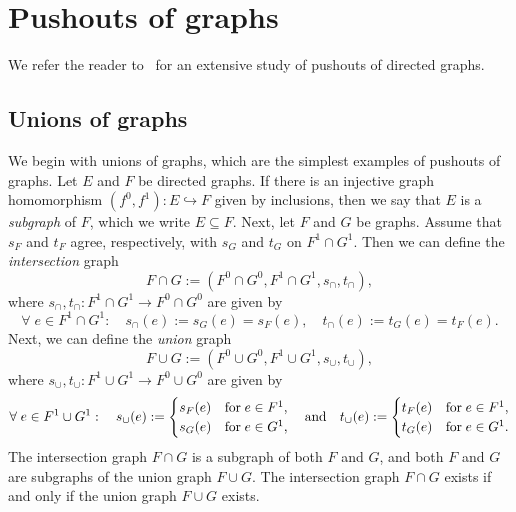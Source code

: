 \documentclass[12pt,times,a4paper]{amsart}
\numberwithin{equation}{section}
\def\text{\hbox}
\numberwithin{equation}{section}
\begin{document}

\section{Pushouts of graphs}
\noindent
We refer the reader to~\cite{ek79} for an extensive study of pushouts of directed graphs.
\subsection{Unions of graphs}
We begin with unions of graphs, which are the simplest examples of pushouts of graphs.
Let $E$ and $F$ be directed graphs. If there is an injective graph homomorphism $(f^0,f^1):E\hookrightarrow F$ given by inclusions,
 then we say that 
$E$ is a {\em subgraph} of $F$, which we write $E\subseteq F$. 
Next, let $F$ and $G$ be graphs.
 Assume that $s_F$ and $t_F$ agree, respectively, with $s_G$ and $t_G$ on $F^1\cap G^1$.
Then we can define the {\em intersection} graph 
\begin{equation}
F\cap G:=(F^0\cap G^0,F^1\cap G^1,s_\cap,t_\cap),
\end{equation}
where $s_\cap,t_\cap:F^1\cap G^1\to F^0\cap G^0$ are given by
\begin{equation}
\forall\; e\in F^1\cap G^1:\quad s_\cap(e):=s_G(e)=s_F(e),\quad t_\cap(e):=t_G(e)=t_F(e).
\end{equation}
Next, we can define the {\em union} graph 
\begin{equation}
F\cup G:=(F^0\cup G^0,F^1\cup G^1,s_\cup,t_\cup),
\end{equation}
where $s_\cup,t_\cup:F^1\cup G^1\to F^0\cup G^0$ are given by
\begin{equation*}
\forall\; e\in F^1\cup G^1:\quad 
s_\cup(e):=
\begin{cases}
s_F(e)&\text{for}\;e\in F^1,\\
s_G(e)&\text{for}\;e\in G^1,
\end{cases}
\quad\text{and}\quad
t_\cup(e):=
\begin{cases}
t_F(e)&\text{for}\;e\in F^1,\\
t_G(e)&\text{for}\;e\in G^1.
\end{cases}
\end{equation*}
The intersection graph $F\cap G$ is a subgraph of both $F$ and $G$, and both $F$ and $G$ are subgraphs of the union graph 
$F\cup G$. The intersection graph $F\cap G$ exists if and only if the union graph $F\cup G$ exists.
\end{document}
